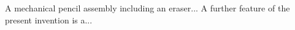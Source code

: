 A mechanical pencil assembly including an eraser...
A further feature of the present invention is a...


